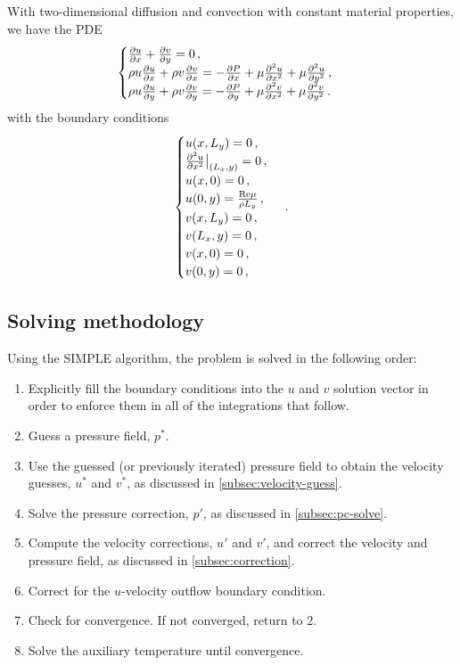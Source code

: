 \documentclass{article}
\begin{document}
With two-dimensional diffusion and convection with constant material properties, we have the PDE
\begin{equation}
\begin{cases}
\pdv{u}{x} + \pdv{v}{y} = 0\,,\\
\rho u \pdv{u}{x} + \rho v \pdv{v}{x} = - \pdv{P}{x} + \mu \pdv{^2u}{x^2} + \mu \pdv{^2u}{y^2}\,,\\
\rho u \pdv{u}{y} + \rho v \pdv{v}{y} = - \pdv{P}{y} + \mu \pdv{^2v}{x^2} + \mu \pdv{^2v}{y^2}\,.
\end{cases}
\label{eq:diffusionconvection}
\end{equation}
with the boundary conditions
\begin{equation}
\begin{cases}
u(x, L_y) = 0\,, \\
\pdv{^2u}{x^2} \big|_{(L_x, y)} = 0 \,, \\
u(x, 0) = 0 \,, \\
u(0, y) = \frac{\mathrm{Re} \mu}{\rho L_y} \,, \\
v(x, L_y) = 0\,, \\
v(L_x, y) = 0 \,, \\
v(x, 0) = 0\,, \\
v(0, y) = 0 \,,
\end{cases}\,.
\end{equation}

\subsection{Solving methodology}

Using the SIMPLE algorithm, the problem is solved in the following order:
\begin{enumerate}
	\item Explicitly fill the boundary conditions into the $u$ and $v$ solution vector in order to enforce them in all of the integrations that follow.
	\item Guess a pressure field, $p^*$.
	\item Use the guessed (or previously iterated) pressure field to obtain the velocity guesses, $u^*$ and $v^*$, as discussed in \ref{subsec:velocity-guess}.
	\item Solve the pressure correction, $p'$, as discussed in \ref{subsec:pc-solve}.
	\item Compute the velocity corrections, $u'$ and $v'$, and correct the velocity and pressure field, as discussed in \ref{subsec:correction}. 
	\item Correct for the $u$-velocity outflow boundary condition.
	\item Check for convergence. If not converged, return to 2.
	\item Solve the auxiliary temperature until convergence.
\end{enumerate}
\end{document}
